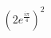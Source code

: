 \documentclass[preview]{standalone}
\begin{document}
\begin{align*}
(2e^{\frac{i\pi}{4}})^2
\end{align*}
\end{document}
